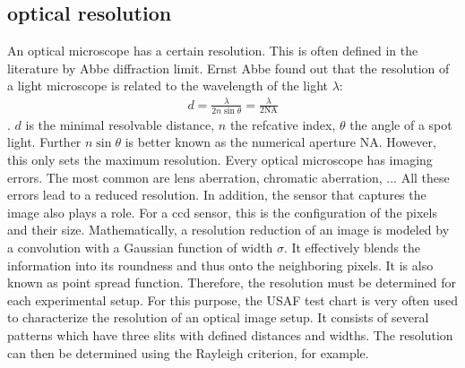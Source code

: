 \subsection{optical resolution}
% 
An optical microscope has a certain resolution. This is often defined in the literature by Abbe diffraction limit. Ernst Abbe found out that the resolution of a light microscope is related to the wavelength of the light $\lambda$:
\begin{align}
d=\frac{ \lambda}{2 n \sin \theta} = \frac{\lambda}{2\mathrm{NA}}
\end{align}
.
$d$ is the minimal resolvable distance, $n$ the refcative index, $\theta$ the angle of a spot light. Further $n \sin \theta$ is better known as the numerical aperture $\mathrm{NA}$.
However, this only sets the maximum resolution. 
Every optical microscope has imaging errors.
The most common are lens aberration, chromatic aberration, ...
All these errors lead to a reduced resolution.
In addition, the sensor that captures the image also plays a role.
For a ccd sensor, this is the configuration of the pixels and their size.
% 
Mathematically, a resolution reduction of an image is modeled by a convolution with a Gaussian function of width $\sigma$.
It effectively blends the information into its roundness and thus onto the neighboring pixels.
It is also known as point spread function.
%
Therefore, the resolution must be determined for each experimental setup.
For this purpose, the USAF test chart is very often used to characterize the resolution of an optical image setup.
It consists of several patterns which have three slits with defined distances and widths.
The resolution can then be determined using the Rayleigh criterion, for example.
% 
\\
% 
% 

